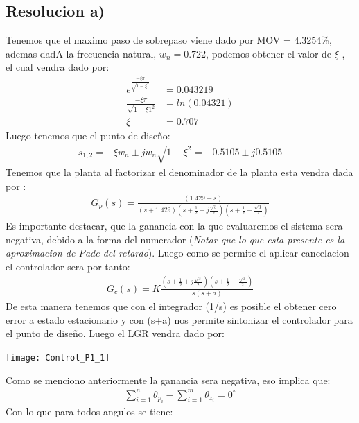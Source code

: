 \documentclass[
  11pt,
  letterpaper,
   addpoints,
  ]{exam}
\begin{document}
\begin{questions}
\begin{solution}
    \subsection*{Resolucion a)}
    Tenemos que el maximo paso de sobrepaso viene dado por MOV = 4.3254\%, ademas dadA la frecuencia natural, $w_n = 0.722$, podemos obtener el valor de $\xi$ , el cual vendra dado por:
    \begin{align}
        e^{\frac{-\xi \pi}{\sqrt{1-\xi^{2}}}} &= 0.043219\\
        \frac{-\xi \pi}{\sqrt{1-\xi1^{2}}} &= ln(0.04321)\\
        \xi &= 0.707
    \end{align}
    Luego tenemos que el punto de diseño:
    \begin{align}
        s_{1,2} = -\xi w_n \pm jw_n\sqrt{1-\xi^{2}} = -0.5105 \pm j0.5105
    \end{align}
    Tenemos que  la planta al factorizar el denominador de la planta esta vendra dada por :
    \begin{align}
        G_{p}(s) = \frac{(1.429 - s)}{(s+1.429)\left(s + \frac{1}{2} + j\frac{\sqrt{3}}{2}\right)\left(s+ \frac{1}{2} - \frac{\sqrt{3}}{2}\right)}
    \end{align}
    Es importante destacar, que la ganancia con la que evaluaremos el sistema sera negativa, debido a la forma del numerador (\textit{Notar que lo que esta presente es la aproximacion de Pade del retardo}). Luego como se permite el aplicar cancelacion el controlador sera por tanto:
    \begin{align}
        G_{c}(s) = K \frac{\left(s + \frac{1}{2} + j\frac{\sqrt{3}}{2}\right)\left(s+ \frac{1}{2} - \frac{\sqrt{3}}{2}\right)}{s(s+a)}
    \end{align}
    De esta manera tenemos que con el integrador (1/s) es posible el obtener cero error a estado estacionario y con (s+a) nos permite sintonizar el controlador para el punto de diseño. Luego el LGR vendra dado por:
    \begin{center}
        \texttt{[image: Control\_P1\_1]}
      \end{center}
    Como se menciono anteriormente la ganancia sera negativa, eso implica que:
    \begin{align}
        \sum_{i=1}^{n} \theta_{p_{i}} - \sum_{i=1}^{m} \theta_{z_{i}} = 0^{\circ} 
    \end{align}
    Con lo que para todos angulos se tiene:
    \begin{align}

\end{align}
\end{solution}
\end{questions}
\end{document}

